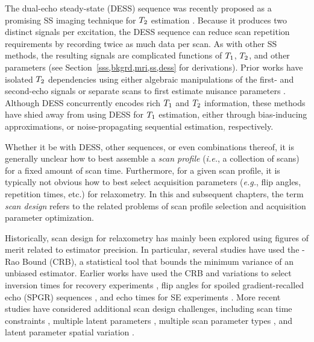 The dual-echo steady-state (DESS) sequence \cite{bruder:88:ans} 
was recently proposed as a promising SS imaging technique 
for $T_2$ estimation \cite{welsch:09:reo}. 
Because it produces two distinct signals per excitation, 
the DESS sequence can reduce scan repetition requirements 
by recording twice as much data per scan. 
As with other SS methods, 
the resulting signals 
\cite{gyngell:89:tss, hanicke:03:aas} 
are complicated functions 
of $T_1$, $T_2$, and other parameters
(see Section~\ref{sss,bkgrd,mri,ss,dess}
for derivations). 
Prior works have isolated $T_2$ dependencies 
using either algebraic manipulations 
of the first- and second-echo signals 
\cite{welsch:09:reo, heule:14:reo} 
or separate scans to first estimate nuisance parameters 
\cite{nataraj:14:mbe}. 
Although DESS concurrently encodes rich $T_1$ and $T_2$ information, 
these methods have shied away from using DESS 
for $T_1$ estimation, 
either through bias-inducing approximations, 
or noise-propagating sequential estimation, 
respectively. 

Whether it be with DESS, other sequences, or even combinations thereof, 
it is generally unclear how to best assemble a \emph{scan profile} 
(\emph{i.e.}, a collection of scans) 
for a fixed amount of scan time. 
Furthermore, for a given scan profile, 
it is typically not obvious how 
to best select acquisition parameters 
(\emph{e.g.}, flip angles, repetition times, etc.) 
for relaxometry. 
In this and subsequent chapters, 
the term \emph{scan design} refers 
to the related problems 
of scan profile selection 
and acquisition parameter optimization.

Historically, scan design for relaxometry
has mainly been explored 
using figures of merit related to estimator precision. 
In particular, several studies have used the \Cramer-Rao Bound (CRB), 
a statistical tool that bounds the minimum variance of an unbiased estimator.
Earlier works have used the CRB and variations 
to select inversion times for recovery experiments 
\cite{weiss:80:tco, zhang:98:dos}, 
flip angles for spoiled gradient-recalled echo (SPGR) sequences \cite{wang:87:otp}, 
and echo times for SE experiments \cite{jones:96:oss}. 
More recent studies have considered additional scan design challenges, 
including scan time constraints \cite{imran:99:tpm}, 
multiple latent parameters \cite{deoni:04:doo}, 
multiple scan parameter types \cite{fleysher:07:otp}, 
and latent parameter spatial variation \cite{akcakaya:15:ots, lewis:16:ddo}. 

